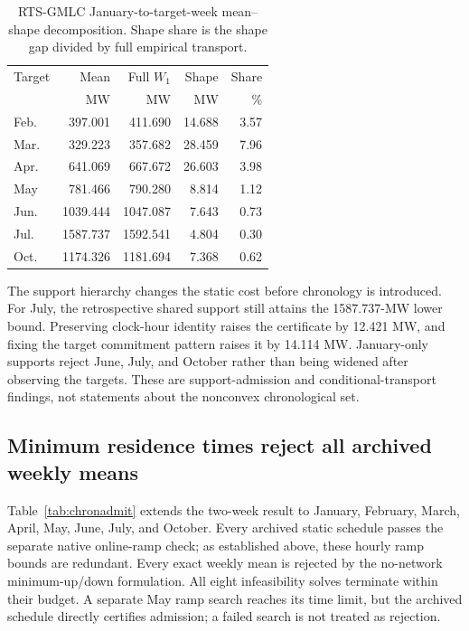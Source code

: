 \documentclass[journal]{IEEEtran}
\begin{document}
\begin{table}[t]
\caption{RTS-GMLC January-to-target-week mean--shape decomposition. Shape share is the shape gap divided by full empirical transport.}
\label{tab:meanshape}
\centering
\footnotesize
\begin{tabular}{lrrrr}
\toprule
Target & Mean & Full $W_1$ & Shape & Share\\
 & MW & MW & MW & \%\\
\midrule
Feb. & 397.001 & 411.690 & 14.688 & 3.57\\
Mar. & 329.223 & 357.682 & 28.459 & 7.96\\
Apr. & 641.069 & 667.672 & 26.603 & 3.98\\
May & 781.466 & 790.280 & 8.814 & 1.12\\
Jun. & 1039.444 & 1047.087 & 7.643 & 0.73\\
Jul. & 1587.737 & 1592.541 & 4.804 & 0.30\\
Oct. & 1174.326 & 1181.694 & 7.368 & 0.62\\
\bottomrule
\end{tabular}
\end{table}

The support hierarchy changes the static cost before chronology is introduced. For July, the retrospective shared support still attains the 1587.737-MW lower bound. Preserving clock-hour identity raises the certificate by 12.421 MW, and fixing the target commitment pattern raises it by 14.114 MW. January-only supports reject June, July, and October rather than being widened after observing the targets. These are support-admission and conditional-transport findings, not statements about the nonconvex chronological set.

\subsection{Minimum residence times reject all archived weekly means}
Table~\ref{tab:chronadmit} extends the two-week result to January, February, March, April, May, June, July, and October. Every archived static schedule passes the separate native online-ramp check; as established above, these hourly ramp bounds are redundant. Every exact weekly mean is rejected by the no-network minimum-up/down formulation. All eight infeasibility solves terminate within their budget. A separate May ramp search reaches its time limit, but the archived schedule directly certifies admission; a failed search is not treated as rejection.
\end{document}
